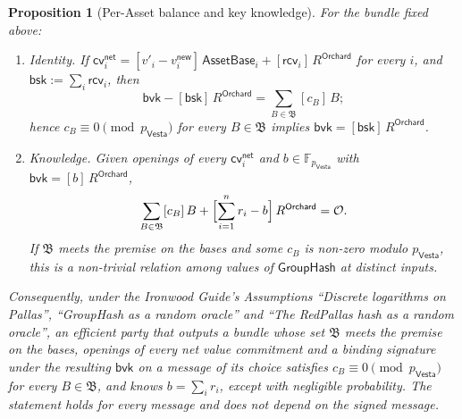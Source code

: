 \documentclass[11pt,a4paper]{article}
\newtheorem{proposition}[theorem]{Proposition}
\theoremstyle{definition}
\newcommand{\F}{\mathbb{F}}
\newcommand{\cvsym}{\mathsf{cv}}
\newcommand{\Vesta}{\ensuremath{\mathsf{Vesta}}}
\newcommand{\GroupHash}{\ensuremath{\mathsf{GroupHash}}}
\newcommand{\rcv}{\ensuremath{\mathsf{rcv}}}
\begin{document}
\begin{proposition}[Per-Asset balance and key knowledge]
\label{prop:zsa-balance}
For the bundle fixed above:
\begin{enumerate}
\item[(i)] Identity. If $\cvsym^{\mathsf{net}}_i =
  [v'_i - v^{\mathsf{new}}_i]\,\mathsf{AssetBase}_i +
  [\rcv_i]\,R^{\mathsf{Orchard}}$ for every $i$, and
  $\mathsf{bsk} := \sum_i \rcv_i$, then
  \[
    \mathsf{bvk} - [\mathsf{bsk}]\,R^{\mathsf{Orchard}}
    = \sum_{B \in \mathfrak{B}} [c_B]\,B;
  \]
  hence $c_B \equiv 0 \pmod{p_{\Vesta}}$ for every $B \in \mathfrak{B}$
  implies $\mathsf{bvk} = [\mathsf{bsk}]\,R^{\mathsf{Orchard}}$.
\item[(ii)] Knowledge. Given openings of every $\cvsym^{\mathsf{net}}_i$
  and $b \in \F_{p_{\Vesta}}$ with $\mathsf{bvk} = [b]\,
  R^{\mathsf{Orchard}}$,
  \[
    \sum_{B \in \mathfrak{B}} [c_B]\,B
    + \Bigl[\sum_{i=1}^{n} r_i - b\Bigr]\,R^{\mathsf{Orchard}}
    = \mathcal{O}.
  \]
  If $\mathfrak{B}$ meets the premise on the bases and some $c_B$ is
  non-zero modulo $p_{\Vesta}$, this is a non-trivial relation among
  values of $\GroupHash$ at distinct inputs.
\end{enumerate}
Consequently, under the \emph{Ironwood Guide}'s Assumptions ``Discrete
logarithms on Pallas'', ``GroupHash as a random oracle'' and ``The
RedPallas hash as a random oracle'', an efficient party that outputs a
bundle whose set $\mathfrak{B}$ meets the premise on the bases, openings of
every net value commitment and a binding signature under the resulting
$\mathsf{bvk}$ on a message of its choice satisfies
$c_B \equiv 0 \pmod{p_{\Vesta}}$ for every $B \in \mathfrak{B}$, and knows
$b = \sum_i r_i$, except with negligible probability. The statement holds
for every message and does not depend on the signed message.


\end{proposition}
\end{document}
